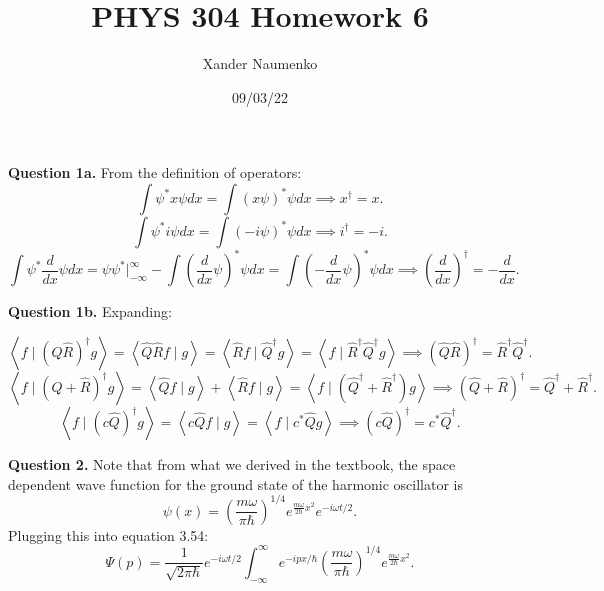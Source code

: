 \documentclass[letterpaper, reqno,11pt]{article}
\begin{document}
\title{PHYS 304 Homework 6}
\date{09/03/22}
\author{Xander Naumenko}
\maketitle

{\noindent\bf Question 1a.} From the definition of operators: 
\[
\int \psi^* x\psi dx=\int(x\psi)^*\psi dx\implies x^\dagger=x
.\]
\[
\int \psi^* i\psi dx=\int(-i\psi)^*\psi dx\implies i^\dagger=-i
.\]
\[
\int \psi^* \frac{d}{dx}\psi dx=\psi\psi^*\bigg|_{-\infty}^{\infty}-\int(\frac{d}{dx}\psi)^*\psi dx=\int(-\frac{d}{dx}\psi)^*\psi dx\implies \left( \frac{d}{dx} \right) ^\dagger=-\frac{d}{dx}
.\]

{\noindent\bf Question 1b.} Expanding: 

\[
\left<f\mid \left( \hat{Q}\hat{R} \right)^{\dagger}g  \right>=\left<\hat{Q}\hat{R}f\mid g \right>=\left<\hat{R} f\mid \hat{Q}^{\dagger}g \right>=\left<f\mid \hat{R}^{\dagger}\hat{Q}^{\dagger}g \right>\implies\left( \hat{Q}\hat{R} \right) ^{\dagger}=\hat{R}^{\dagger}\hat{Q}^{\dagger}
.\]
\[
\left<f\mid \left( \hat{Q}+\hat{R} \right) ^{\dagger}g \right>=\left<\hat{Q}f\mid g \right>+\left<\hat{R}f\mid g \right>=\left<f\mid \left( \hat{Q}^{\dagger} +\hat{R}^{\dagger}\right) g \right>\implies \left( \hat{Q} +\hat{R}\right)^{\dagger}=\hat{Q}^{\dagger}+\hat{R}^{\dagger}
.\]
\[
\left<f\mid \left( c\hat{Q} \right) ^{\dagger}g \right>=\left<c\hat{Q} f\mid g \right>=\left<f\mid c^*\hat{Q}g \right>\implies \left( c\hat{Q} \right) ^{\dagger}=c^*\hat{Q}^{\dagger}
.\]

{\noindent\bf Question 2.} Note that from what we derived in the textbook, the space dependent wave function for the ground state of the harmonic oscillator is 
\[
\psi(x)=\left( \frac{m\omega}{\pi \hbar} \right)^{1 /4}e^{\frac{m\omega}{2\hbar}x^2}e^{-i\omega t /2}
.\]
Plugging this into equation 3.54: 
\[
\Psi(p)=\frac{1}{\sqrt{2\pi\hbar} }e^{-i\omega t /2}\int_{-\infty}^{\infty}e^{-ipx /\hbar}\left( \frac{m\omega}{\pi \hbar} \right)^{1 /4}e^{\frac{m\omega}{2\hbar}x^2}
.\]
\end{document}
